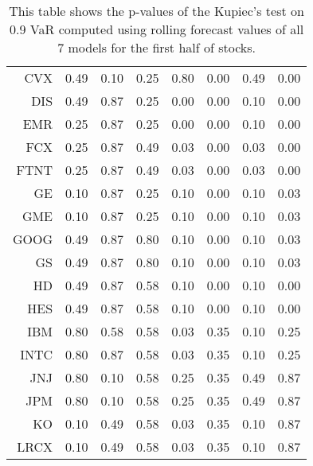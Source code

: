 \begin{table}[ht]
\begin{tabular}{rrrrrrrr}
  CVX & 0.49 & 0.10 & 0.25 & 0.80 & 0.00 & 0.49 & 0.00 \\ 
  DIS & 0.49 & 0.87 & 0.25 & 0.00 & 0.00 & 0.10 & 0.00 \\ 
  EMR & 0.25 & 0.87 & 0.25 & 0.00 & 0.00 & 0.10 & 0.00 \\ 
  FCX & 0.25 & 0.87 & 0.49 & 0.03 & 0.00 & 0.03 & 0.00 \\ 
  FTNT & 0.25 & 0.87 & 0.49 & 0.03 & 0.00 & 0.03 & 0.00 \\ 
  GE & 0.10 & 0.87 & 0.25 & 0.10 & 0.00 & 0.10 & 0.03 \\ 
  GME & 0.10 & 0.87 & 0.25 & 0.10 & 0.00 & 0.10 & 0.03 \\ 
  GOOG & 0.49 & 0.87 & 0.80 & 0.10 & 0.00 & 0.10 & 0.03 \\ 
  GS & 0.49 & 0.87 & 0.80 & 0.10 & 0.00 & 0.10 & 0.03 \\ 
  HD & 0.49 & 0.87 & 0.58 & 0.10 & 0.00 & 0.10 & 0.00 \\ 
  HES & 0.49 & 0.87 & 0.58 & 0.10 & 0.00 & 0.10 & 0.00 \\ 
  IBM & 0.80 & 0.58 & 0.58 & 0.03 & 0.35 & 0.10 & 0.25 \\ 
  INTC & 0.80 & 0.87 & 0.58 & 0.03 & 0.35 & 0.10 & 0.25 \\ 
  JNJ & 0.80 & 0.10 & 0.58 & 0.25 & 0.35 & 0.49 & 0.87 \\ 
  JPM & 0.80 & 0.10 & 0.58 & 0.25 & 0.35 & 0.49 & 0.87 \\ 
  KO & 0.10 & 0.49 & 0.58 & 0.03 & 0.35 & 0.10 & 0.87 \\ 
  LRCX & 0.10 & 0.49 & 0.58 & 0.03 & 0.35 & 0.10 & 0.87 \\ 
   \hline
\end{tabular}
\caption[Kupiec's test p-values, alpha =0.9 (1)]{This table shows the p-values of the Kupiec's test on 0.9 VaR computed using rolling forecast values of all 7 models for the first half of stocks.} 
\label{Table:Kupiec_test_rolling_0.9_1}
\end{table}

